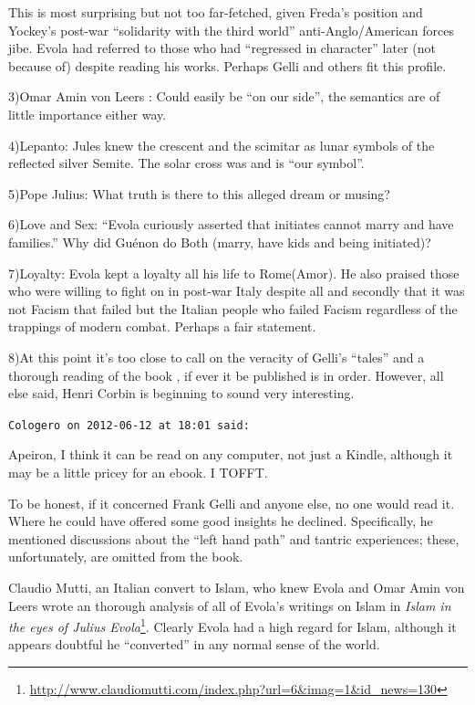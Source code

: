 \begin{footnotesize}
\begin{sffamily}
This is most surprising but not too far-fetched, given Freda's position and Yockey's post-war ``solidarity with the third world'' anti-Anglo/American forces jibe. Evola had referred to those who had ``regressed in character'' later (not because of) despite reading his works. Perhaps Gelli and others fit this profile.

3)Omar Amin von Leers : Could easily be ``on our side'', the semantics are of little importance either way.

4)Lepanto: Jules knew the crescent and the scimitar as lunar symbols of the reflected silver Semite. The solar cross was and is ``our symbol''.

5)Pope Julius: What truth is there to this alleged dream or musing?

6)Love and Sex: ``Evola curiously asserted that initiates cannot marry and have families.'' Why did Guénon do Both (marry, have kids and being initiated)?

7)Loyalty: Evola kept a loyalty all his life to Rome(Amor). He also praised those who were willing to fight on in post-war Italy despite all and secondly that it was not Facism that failed but the Italian people who failed Facism regardless of the trappings of modern combat. Perhaps a fair statement.

8)At this point it's too close to call on the veracity of Gelli's ``tales'' and a thorough reading of the book , if ever it be published is in order. However, all else said, Henri Corbin is beginning to sound very interesting.

\hfill

\texttt{Cologero on 2012-06-12 at 18:01 said:}

Apeiron, I think it can be read on any computer, not just a Kindle, although it may be a little pricey for an ebook. I TOFFT.

To be honest, if it concerned Frank Gelli and anyone else, no one would read it. Where he could have offered some good insights he declined. Specifically, he mentioned discussions about the ``left hand path'' and tantric experiences; these, unfortunately, are omitted from the book.

Claudio Mutti, an Italian convert to Islam, who knew Evola and Omar Amin von Leers wrote an thorough analysis of all of Evola's writings on Islam in \textit{Islam in the eyes of Julius Evola}\footnote{\url{http://www.claudiomutti.com/index.php?url=6&imag=1&id\_news=130}}. Clearly Evola had a high regard for Islam, although it appears doubtful he ``converted'' in any normal sense of the world.


\end{sffamily}
\end{footnotesize}
